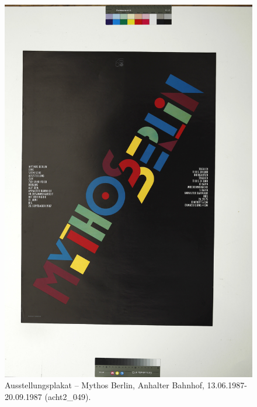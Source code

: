 \documentclass[a4paper,12pt,ngerman]{article}
\begin{document}
\newpage
\begin{figure}[ht]
\includegraphics[width=\linewidth]{Abbildung_20_(acht2_049)}
\centering
\caption{Ausstellungsplakat -- Mythos Berlin, Anhalter Bahnhof, 13.06.1987-20.09.1987 (acht2\_049).}
\end{figure}
\end{document}
